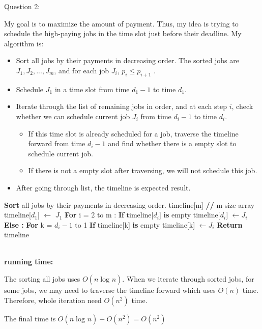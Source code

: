 \documentclass[12pt]{article}
\begin{document}
\pagebreak
\noindent
\large Question 2: \vspace{5mm} \par
\normalsize 
My goal is to maximize the amount of payment. Thus, my idea is trying to schedule the high-paying jobs in the time slot just before their deadline. My algorithm is:
\begin{itemize}
  \item	Sort all jobs by their payments in decreasing order. 
	The sorted jobs are $J_1, J_2, ..., J_m$, and for each job $J_i$, $p_i \leq p_{i+1}$ .
  \item	Schedule $J_1$ in a time slot from time $d_1-1$ to time $d_1$. 
  \item Iterate through the list of remaining jobs in order, and at each step $i$, check whether we can schedule current job $J_i$ from time $d_i-1$ to time $d_i$.
	\begin{itemize}
	\item If this time slot is already scheduled for a job, traverse the timeline forward from time $d_i-1$ and find whether there is a empty slot to schedule current job.
	\item If there is not a empty slot after traversing, we will not schedule this job.
  	\end{itemize}
  \item After going through list, the timeline is expected result. 
\end{itemize}

\begin{algorithm}
\begin{algorithmic}
\State \textbf{Sort} all jobs by their payments in decreasing order.
\State timeline[m] \textbf{ //} m-size array
\State timeline[$d_1$] $\leftarrow$ $J_1$
\State \textbf{For} i = 2 to m :
\State \hspace{0.4cm} \textbf{If} timeline[$d_i$] \textbf{is} empty
\State \hspace{0.8cm} \textbf{}timeline[$d_i$] $\leftarrow J_i$
\State \hspace{0.4cm} \textbf{Else :}
\State \hspace{0.8cm} \textbf{For} k = $d_i-1$ to 1
\State \hspace{1.2cm} \textbf{If} timeline[k] \textbf{is} empty
\State \hspace{1.6cm} \textbf{} timeline[k] $\leftarrow J_i$
\State \textbf{Return} timeline
\end{algorithmic}
\end{algorithm}
\noindent \\
\textbf{running time:} \par
The sorting all jobs uses $O(n\log_{}{n})$. 
When we iterate through sorted jobs, for some jobs, we may need to traverse the timeline forward which uses $O(n)$ time.
Therefore, whole iteration need $O(n^2)$ time. \par
The final time is $O(n\log_{}{n}) + O(n^2) = O(n^2)$
\end{document}
